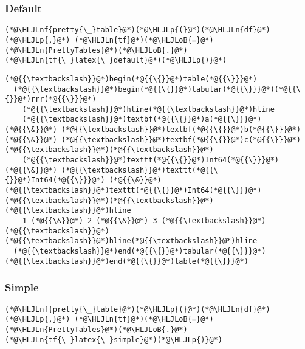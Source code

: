 \documentclass[12pt,a4paper]{article}
\newcommand{\HLJLn}[1]{#1}
\newcommand{\HLJLnf}[1]{\textcolor[RGB]{66,102,213}{#1}}
\newcommand{\HLJLoB}[1]{\textcolor[RGB]{102,102,102}{\textbf{#1}}}
\newcommand{\HLJLp}[1]{#1}
\begin{document}
\subsubsection{Default}

\begin{lstlisting}
(*@\HLJLnf{pretty{\_}table}@*)(*@\HLJLp{(}@*)(*@\HLJLn{df}@*)(*@\HLJLp{,}@*) (*@\HLJLn{tf}@*)(*@\HLJLoB{=}@*)(*@\HLJLn{PrettyTables}@*)(*@\HLJLoB{.}@*)(*@\HLJLn{tf{\_}latex{\_}default}@*)(*@\HLJLp{)}@*)
\end{lstlisting}

\begin{lstlisting}
(*@{{\textbackslash}}@*)begin(*@{{\{}}@*)table(*@{{\}}}@*)
  (*@{{\textbackslash}}@*)begin(*@{{\{}}@*)tabular(*@{{\}}}@*)(*@{{\{}}@*)rrr(*@{{\}}}@*)
    (*@{{\textbackslash}}@*)hline(*@{{\textbackslash}}@*)hline
    (*@{{\textbackslash}}@*)textbf(*@{{\{}}@*)a(*@{{\}}}@*) (*@{{\&}}@*) (*@{{\textbackslash}}@*)textbf(*@{{\{}}@*)b(*@{{\}}}@*) (*@{{\&}}@*) (*@{{\textbackslash}}@*)textbf(*@{{\{}}@*)c(*@{{\}}}@*) (*@{{\textbackslash}}@*)(*@{{\textbackslash}}@*)
    (*@{{\textbackslash}}@*)texttt(*@{{\{}}@*)Int64(*@{{\}}}@*) (*@{{\&}}@*) (*@{{\textbackslash}}@*)texttt(*@{{\{}}@*)Int64(*@{{\}}}@*) (*@{{\&}}@*) (*@{{\textbackslash}}@*)texttt(*@{{\{}}@*)Int64(*@{{\}}}@*) (*@{{\textbackslash}}@*)(*@{{\textbackslash}}@*)(*@{{\textbackslash}}@*)hline
    1 (*@{{\&}}@*) 2 (*@{{\&}}@*) 3 (*@{{\textbackslash}}@*)(*@{{\textbackslash}}@*)(*@{{\textbackslash}}@*)hline(*@{{\textbackslash}}@*)hline
  (*@{{\textbackslash}}@*)end(*@{{\{}}@*)tabular(*@{{\}}}@*)
(*@{{\textbackslash}}@*)end(*@{{\{}}@*)table(*@{{\}}}@*)
\end{lstlisting}


\subsubsection{Simple}

\begin{lstlisting}
(*@\HLJLnf{pretty{\_}table}@*)(*@\HLJLp{(}@*)(*@\HLJLn{df}@*)(*@\HLJLp{,}@*) (*@\HLJLn{tf}@*)(*@\HLJLoB{=}@*)(*@\HLJLn{PrettyTables}@*)(*@\HLJLoB{.}@*)(*@\HLJLn{tf{\_}latex{\_}simple}@*)(*@\HLJLp{)}@*)
\end{lstlisting}
\end{document}
